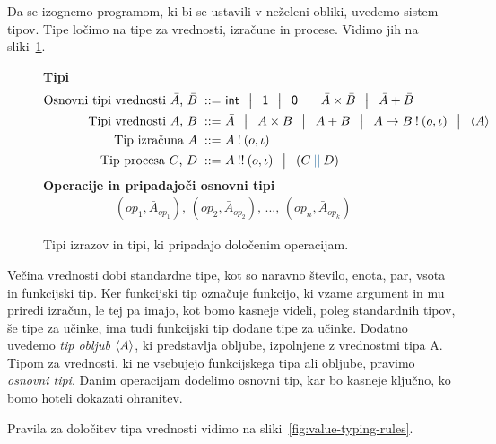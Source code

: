 Da se izognemo programom, ki bi se ustavili v neželeni obliki, uvedemo sistem tipov.
Tipe ločimo na tipe za vrednosti, izračune in procese. Vidimo jih na sliki~\ref{fig:tipi}.

\begin{figure}[H]
	\centering
	\small
	\textbf{Tipi}
	\begin{align*}
		\text{Osnovni tipi vrednosti $\bar{A}$, $\bar{B}$}
		\bnfis & \tysym{int} \,\bnfor\! \tyunit \,\bnfor\! \tyempty \,\bnfor\! \typrod{\bar{A}}{\bar{B}} \,\bnfor\! \tysum{\bar{A}}{\bar{B}}
		\\%
		\text{Tipi vrednosti $A$, $B$}
		\bnfis & \bar{A} \, \bnfor\! \typrod{A}{B} \,\bnfor\! \tysum{A}{B} \,\bnfor\! \tyfun{A}{\tycomp{B}{\o,\i}} \,\bnfor\! \typromise{A}
		\\
		\text{Tip izračuna $A$} \bnfis& \tycomp{A}{\o,\i}
		\\
		\text{Tip procesa $\tyC$, $\tyD$}  \bnfis & \tyrun{A}{\o, \i} \,\bnfor\! \typar{\tyC}{\tyD}
	\end{align*}
	\textbf{Operacije in pripadajoči osnovni tipi}
	\begin{align*}
		(op_1, \bar{A}_{op_1}),\, (op_2, \bar{A}_{op_2}),\, ... ,\, (op_n, \bar{A}_{op_k})
	\end{align*}
	\caption{Tipi izrazov in tipi, ki pripadajo določenim operacijam.}
	\label{fig:tipi}
\end{figure}

Večina vrednosti dobi standardne tipe, kot so naravno število, enota, par, vsota in funkcijski tip. 
Ker funkcijski tip označuje funkcijo, ki vzame argument in mu priredi izračun, le tej pa imajo, kot bomo kasneje videli, poleg standardnih tipov, še tipe za učinke, ima tudi funkcijski tip dodane tipe za učinke.
Dodatno uvedemo \emph{tip obljub} $\langle A \rangle$, ki predstavlja obljube, izpolnjene z vrednostmi tipa A. 
Tipom za vrednosti, ki ne vsebujejo funkcijskega tipa ali obljube, pravimo \emph{osnovni tipi}.
Danim operacijam dodelimo osnovni tip, kar bo kasneje ključno, ko bomo hoteli dokazati ohranitev.

Pravila za določitev tipa vrednosti vidimo na sliki~\ref{fig:value-typing-rules}.

